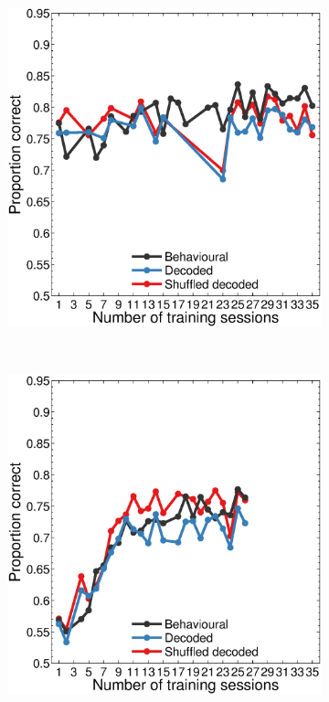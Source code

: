 \begin{figure}[htbp]
    \begin{subfigure}[b]{0.5\linewidth}
        \centering
        \caption{}
        \label{fig:dec_b4_allp}
	\includegraphics[width=\linewidth]{figs/decoding/perf_v4_blanco.eps}
    \end{subfigure}
    ~~
    \begin{subfigure}[b]{0.5\linewidth}
        \centering
        \caption{}
        \label{fig:dec_j4_allp}
	\includegraphics[width=\linewidth]{figs/decoding/perf_v4_jack.eps}

\end{subfigure}
\end{figure}
